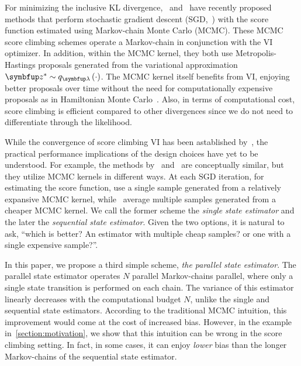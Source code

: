 For minimizing the inclusive KL divergence,~\citet{NEURIPS2020_b2070693} and~\citet{pmlr-v124-ou20a} have recently proposed  methods that perform stochastic gradient descent (SGD,~\citealt{robbins_stochastic_1951}) with the score function estimated using Markov-chain Monte Carlo (MCMC).
These MCMC score climbing schemes operate a Markov-chain in conjunction with the VI optimizer.
In addition, within the MCMC kernel, they both use Metropolis-Hastings proposals generated from the variational approximation \(\vz^* \sim q_{\vlambda}\left(\cdot\right)\).
The MCMC kernel itself benefits from VI, enjoying better proposals over time without the need for computationally expensive proposals as in Hamiltonian Monte Carlo~\citep{duane_hybrid_1987, neal_mcmc_2011, betancourt_conceptual_2017}.
Also, in terms of computational cost, score climbing is efficient compared to other divergences since we do not need to differentiate through the likelihood.

While the convergence of score climbing VI has been astablished by~\citet{NEURIPS2020_b2070693, gu_stochastic_1998}, the practical performance implications of the design choices have yet to be understood.
For example, the methods by~\citeauthor{NEURIPS2020_b2070693} and~\citet{pmlr-v124-ou20a} are conceptually similar, but they utilize MCMC kernels in different ways.
At each SGD iteration, for estimating the score function, \citeauthor{NEURIPS2020_b2070693} use a single sample generated from a relatively expansive MCMC kernel, while~\citeauthor{pmlr-v124-ou20a} average multiple samples generated from a cheaper MCMC kernel.
We call the former scheme the \textit{single state estimator} and the later the \textit{sequential state estimator}.
Given the two options, it is natural to ask, ``which is better? An estimator with multiple cheap samples? or one with a single expensive sample?''.

In this paper, we propose a third simple scheme, \textit{the parallel state estimator}.
The parallel state estimator operates \(N\) parallel Markov-chains parallel, where only a single state transition is performed on each chain.
The variance of this estimator linearly decreases with the computational budget \(N\), unlike the single and sequential state estimators.
According to the traditional MCMC intuition, this improvement would come at the cost of increased bias.
However, in the example in~\cref{section:motivation}, we show that this intuition can be wrong in the score climbing setting.
In fact, in some cases, it can enjoy \textit{lower} bias than the longer Markov-chains of the sequential state estimator.

